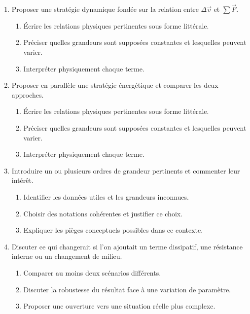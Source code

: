 \documentclass[11pt,a4paper]{article}
\begin{document}
\begin{enumerate}[label=\textbf{Très long \arabic*.},leftmargin=*]
\begin{enumerate}[label=\textbf{\arabic*)}]
\begin{enumerate}[label=\alph*)]
\item Préciser quelles grandeurs sont supposées constantes et lesquelles peuvent varier.
\item Interpréter physiquement chaque terme.
\end{enumerate}
\item Proposer une stratégie dynamique fondée sur la relation entre $\Delta\vec v$ et $\sum\vec F$.
\begin{enumerate}[label=\alph*)]
\item Écrire les relations physiques pertinentes sous forme littérale.
\item Préciser quelles grandeurs sont supposées constantes et lesquelles peuvent varier.
\item Interpréter physiquement chaque terme.
\end{enumerate}
\item Proposer en parallèle une stratégie énergétique et comparer les deux approches.
\begin{enumerate}[label=\alph*)]
\item Écrire les relations physiques pertinentes sous forme littérale.
\item Préciser quelles grandeurs sont supposées constantes et lesquelles peuvent varier.
\item Interpréter physiquement chaque terme.
\end{enumerate}
\item Introduire un ou plusieurs ordres de grandeur pertinents et commenter leur intérêt.
\begin{enumerate}[label=\alph*)]
\item Identifier les données utiles et les grandeurs inconnues.
\item Choisir des notations cohérentes et justifier ce choix.
\item Expliquer les pièges conceptuels possibles dans ce contexte.
\end{enumerate}
\item Discuter ce qui changerait si l'on ajoutait un terme dissipatif, une résistance interne ou un changement de milieu.
\begin{enumerate}[label=\alph*)]
\item Comparer au moins deux scénarios différents.
\item Discuter la robustesse du résultat face à une variation de paramètre.
\item Proposer une ouverture vers une situation réelle plus complexe.
\end{enumerate}

\end{enumerate}
\end{enumerate}
\end{document}
